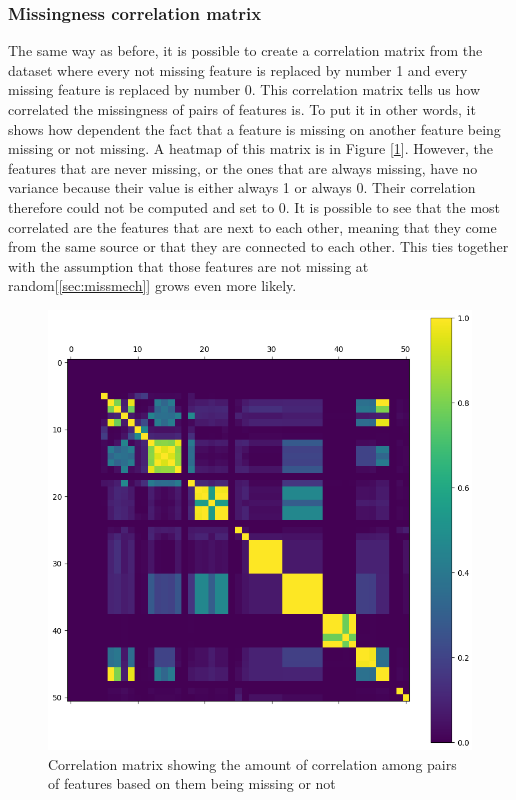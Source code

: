 \documentclass[11pt]{article}
\begin{document}
      \subsubsection{Missingness correlation matrix}
        The same way as before, it is possible to create a correlation matrix from the dataset where every not missing feature is replaced by number 1 and every missing feature is replaced by number 0. This correlation matrix tells us how correlated the missingness of pairs of features is. To put it in other words, it shows how dependent the fact that a feature is missing on another feature being missing or not missing. A heatmap of this matrix is in Figure [\ref{figure:missingness_matrix}]. However, the features that are never missing, or the ones that are always missing, have no variance because their value is either always 1 or always 0. Their correlation therefore could not be computed and set to 0. It is possible to see that the most correlated are the features that are next to each other, meaning that they come from the same source or that they are connected to each other. This ties together with the assumption that those features are not missing at random[\ref{sec:missmech}] grows even more likely.
        \begin{figure}
          \centering
          \caption{Correlation matrix showing the amount of correlation among pairs of features based on them being missing or not}
          \label{figure:missingness_matrix}
          \includegraphics[scale=0.6]{thesis_res/miss/heatmap_cropped.png}
        \end{figure}
      \newpage
\end{document}

